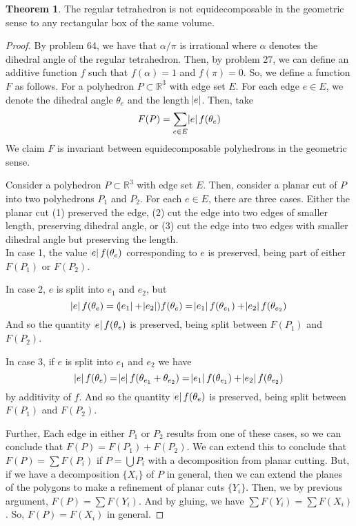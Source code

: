 \documentclass[12pt]{amsart}
\theoremstyle{definition}
\newtheorem{theorem}{Theorem}[subsection]
\begin{document}
\begin{theorem}
    The regular tetrahedron is not equidecomposable in the geometric sense
    to any rectangular box of the same volume.
\end{theorem}
\begin{proof}
    By problem 64, we have that $\alpha/\pi$ is irrational where $\alpha$
    denotes the dihedral angle of the regular tetrahedron. Then, by problem
    27, we can define an additive function $f$ such that $f(\alpha) = 1$
    and $f(\pi) = 0$. 
    So, we define a function $F$ as follows. For a polyhedron $P \subset
    \mathbb{R}^3$ with edge set $E$. For each edge $e \in E$, we denote the
    dihedral angle $\theta_e$ and the length $\abs{e}$.  Then, take $$ F(P)
    = \sum_{e \in E} \abs{e} f(\theta_e)$$ We claim $F$ is invariant
    between equidecomposable polyhedrons in the geometric sense. 

    Consider a polyhedron $P \subset \mathbb{R}^3$ with edge set $E$. Then,
    consider a planar cut of $P$ into two polyhedrons $P_1$ and $P_2$. For
    each $e \in E$, there are three cases. Either the planar cut (1)
    preserved the edge, (2) cut the edge into two edges of smaller length,
    preserving dihedral angle, or (3) cut the edge into two edges with
    smaller dihedral angle but preserving the length. \\
    
    In case 1, the value $\abs{e}f(\theta_e)$
    corresponding to $e$ is preserved, being part of either $F(P_1)$ or
    $F(P_2)$. 
    
    In case 2, $e$ is split into $e_1$ and $e_2$, but
    $$\abs{e}f(\theta_e) = (\abs{e_1}+\abs{e_2})f(\theta_e) =
    \abs{e_1}f(\theta_{e_1}) + \abs{e_2}f(\theta_{e_2})$$ And so the
    quantity $\abs{e}f(\theta_e)$ is preserved, being split between
    $F(P_1)$ and $F(P_2)$.

    In case 3, if $e$ is split into $e_1$ and $e_2$
    we have $$\abs{e}f(\theta_e) = \abs{e}f(\theta_{e_1}+\theta_{e_2}) =
    \abs{e_1}f(\theta_{e_1}) + \abs{e_2}f(\theta_{e_2})$$ by additivity of
    $f$. And so the quantity $\abs{e}f(\theta_e)$ is preserved, being split
    between $F(P_1)$ and $F(P_2)$. 
    
    Further, Each edge in either $P_1$ or $P_2$ results from one of these
    cases, so we can conclude that $F(P) = F(P_1) + F(P_2)$. We can extend
    this to conclude that $F(P) = \sum F(P_i)$ if $P = \bigcup P_i$ with a
    decomposition from planar cutting. But, if we have a decomposition
    $\{X_i\}$ of $P$ in general, then we can extend the planes of the
    polygons to make a refinement of planar cuts $\{Y_i\}$. Then, we by
    previous argument, $F(P) = \sum F(Y_i)$. And by gluing, we have $\sum
    F(Y_i) = \sum F(X_i)$. So, $F(P) = F(X_i)$ in general.


\end{proof}
\end{document}
